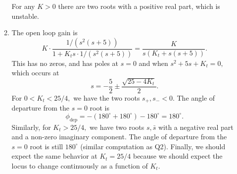 \documentclass{article}
\begin{document}
\begin{enumerate}[label=\textbf{3.\arabic*}]
\begin{enumerate}[label=(\alph*)]
\begin{center}
    \end{center}
    For any $K>0$ there are two roots with a positive real part, which is unstable.
    \item The open loop gain is 
    \begin{equation}
        K \cdot \frac{1/(s^2(s+5))}{1+K_ts \cdot 1/(s^2(s+5))} = \frac{K}{s (K_{t} + s (s + 5))}.
    \end{equation}
    This has no zeros, and has poles at $s=0$ and when $s^2+5s+K_t=0,$ which occurs at 
    \begin{equation}
        s = -\frac{5}{2} \pm \frac{\sqrt{25-4K_t}}{2}.
    \end{equation}
    For $0<K_t < 25/4,$ we have the two roots $s_+,s_- < 0.$ The angle of departure from the $s=0$ root is 
    \begin{equation}
        \phi_\text{dep} = -(180^\circ + 180^\circ)-180^\circ = 180^\circ.
    \end{equation}
    Similarly, for $K_t > 25/4,$ we have two roots $s,\bar{s}$ with a negative real part and a non-zero imaginary component. The angle of departure from the $s=0$ root is still $180^\circ$ (similar computation as Q2). Finally, we should expect the same behavior at $K_t=25/4$ because we should expect the locus to change continuously as a function of $K_t.$


\end{enumerate}
\end{enumerate}
\end{document}
